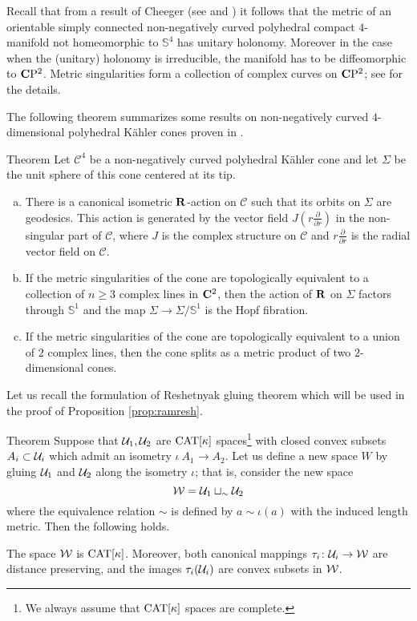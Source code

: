 \documentclass{compositio}
\begin{document}
Recall that from a result of Cheeger (see \cite{cheeger} and \cite[Proposition 2.3]{panov})
it follows that the metric of an orientable simply connected non-negatively curved polyhedral
compact $4$-manifold not homeomorphic to $\mathbb{S}^4$ has unitary holonomy.
Moreover in the case when the (unitary) holonomy is irreducible,
the manifold has to be diffeomorphic to $\mathbf{C}\mathrm{P}^2$. Metric singularities
form a collection of complex curves on $\mathbf{C}\mathrm{P}^2$;
see \cite{panov} for the details.

The following theorem summarizes some results on non-negatively
curved $4$-dimensional polyhedral K\"ahler cones proven in \cite[Theorems 1.5, 1.7, 1.8]{panov}.

\begin{thm}{Theorem}\label{allPK}
Let $\mathcal C^4$ be a non-negatively curved polyhedral K\"ahler cone and let $\Sigma$
be the unit sphere of this cone centered at its tip.

\begin{enumerate}[(a)]
\item There is a canonical isometric $\mathbf{R}$-action on $\mathcal C$
such that its orbits on $\Sigma$ are geodesics. This action is generated
by the vector field $J(r\frac{\partial}{\partial r})$ in the non-singular part
of $\mathcal C$, where $J$ is the complex structure on $\mathcal C$ and $r\frac{\partial}{\partial r}$
is the radial vector field on $\mathcal C$.
\item If the metric singularities of the cone are topologically equivalent to
a collection of $n\ge 3$ complex lines in $\mathbf{C}^2$, then the action
of $\mathbf{R}$ on $\Sigma$ factors through $\mathbb{S}^1$ and the map
$\Sigma\to \Sigma/\mathbb{S}^1$ is the Hopf fibration.
\item\label{allPK:3} If the metric singularities of the cone are topologically equivalent to
a union of $2$ complex lines, then the cone splits as a metric product
of two $2$-dimensional cones.
\end{enumerate}
\end{thm}

Let us recall the formulation of Reshetnyak gluing theorem which will be used in the proof of  Proposition \ref{prop:ramresh}.

\begin{thm}{Theorem}\label{thm:gluing}
Suppose that
$\mathcal{U}_1, \mathcal{U}_2$ are $\mathrm{CAT}[\kappa]$ spaces\footnote{We always assume that $\mathrm{CAT}[\kappa]$ spaces are complete.} with
closed convex subsets $A_i\subset\mathcal{U}_i$
which admit an isometry $\iota\:A_1\to A_2$.
Let us define a new space $W$ by gluing 
$\mathcal{U}_1$ and  $\mathcal{U}_2$ along the isometry $\iota$;
that is,  consider the new space
\[\mathcal{W}=\mathcal{U}_1\sqcup_\sim\mathcal{U}_2\]
where the equivalence relation $\sim$ is defined by $a\sim \iota(a)$ with the induced length metric. Then the following holds.

The space $\mathcal{W}$ is $\mathrm{CAT}[\kappa]$.
Moreover, both canonical mappings
$\tau_i\colon\mathcal{U}_i\to\mathcal{W}$ are distance preserving,
and the images $\tau_i(\mathcal{U}_i)$ are convex subsets in $\mathcal{W}$.
\end{thm}
\end{document}
